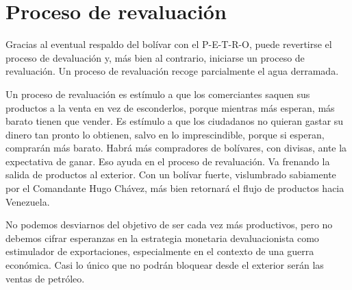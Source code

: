 %
\section{Proceso de revaluación}
\label{sec:annexb}
%
Gracias al eventual respaldo del bolívar con el P-E-T-R-O, puede revertirse el proceso de devaluación y, más bien al contrario, iniciarse un proceso de revaluación. Un proceso de revaluación recoge parcialmente el agua derramada.

Un proceso de revaluación es estímulo a que los comerciantes saquen sus productos a la venta en vez de esconderlos, porque mientras más esperan, más barato tienen que vender. Es estímulo a que los ciudadanos no quieran gastar su dinero tan pronto lo obtienen, salvo en lo imprescindible, porque si esperan, comprarán más barato. Habrá más compradores de bolívares, con divisas, ante la expectativa de ganar. Eso ayuda en el proceso de revaluación. Va frenando la salida de productos al exterior. Con un bolívar fuerte, vislumbrado sabiamente por el Comandante Hugo Chávez, más bien retornará el flujo de productos hacia Venezuela. 

No podemos desviarnos del objetivo de ser cada vez más productivos, pero no debemos cifrar esperanzas en la estrategia monetaria devaluacionista como estimulador de exportaciones, especialmente en el contexto de una guerra económica. Casi lo único que no podrán bloquear desde el exterior serán las ventas de petróleo.